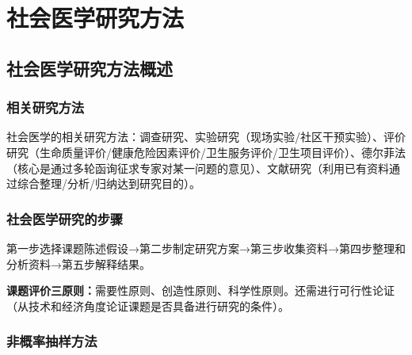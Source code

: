 \chapter{社会医学研究方法}
\setcounter{chapter}{8}

\section{社会医学研究方法概述}

\subsection{相关研究方法}

\begin{defbox}
社会医学的相关研究方法：调查研究、实验研究（现场实验/社区干预实验）、评价研究（生命质量评价/健康危险因素评价/卫生服务评价/卫生项目评价）、德尔菲法（核心是通过多轮函询征求专家对某一问题的意见）、文献研究（利用已有资料通过综合整理/分析/归纳达到研究目的）。
\end{defbox}

\subsection{社会医学研究的步骤}

\begin{defbox}
第一步选择课题陈述假设→第二步制定研究方案→第三步收集资料→第四步整理和分析资料→第五步解释结果。

\textbf{课题评价三原则：}需要性原则、创造性原则、科学性原则。还需进行可行性论证（从技术和经济角度论证课题是否具备进行研究的条件）。
\end{defbox}

\subsection{非概率抽样方法}

